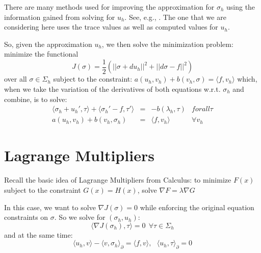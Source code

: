\documentclass{article}
\begin{document}
There are many methods used for improving the approximation for $\sigma_h$ 
using the information gained from solving for $u_h$. 
See, e.g., \cite{ckk02}.
The one that we are 
considering here uses the trace values as well as computed values for $u_h$. 

So, given the approximation $u_h$, we then solve the minimization problem:
minimize the functional 
$$J(\sigma)=\frac{1}{2}\left(||\sigma+du_h||^2+||d\sigma-f||^2\right)$$
over all $\sigma\in\Sigma_h$ 
subject to the constraint: $a(u_h,v_h)+b(v_h,\sigma)=\langle f,v_h\rangle$
which, when we take the variation of the derivatives of 
both equations w.r.t. $\sigma_h$ and combine, is to solve: 
$$\begin{array}{rclr}
	\langle\sigma_h+u_h',\tau\rangle+\langle\sigma_h'-f,\tau'\rangle&=&
	-b(\lambda_h,\tau)&forall\tau\\
	a(u_h,v_h)+b(v_h,\sigma_h)&=&\langle f,v_h\rangle&\forall v_h
\end{array}$$

\section{Lagrange Multipliers}
Recall the basic idea of Lagrange Multipliers from Calculus: 
to minimize $F(x)$ subject to the constraint $G(x) = H(x)$, 
solve $\nabla F=\lambda\nabla G$ 

In this case, we want to solve $\nabla J(\sigma)=0$ while enforcing 
the original equation constraints on $\sigma$. 
So we solve for $(\sigma_h, u_h)$: 
$$\langle\nabla J(\sigma_h), \tau\rangle = 0~~\forall\tau\in\Sigma_h$$
and at the same time:  
$$
\langle u_h,v\rangle-\langle v,\sigma_h\rangle_\partial=\langle f,v\rangle,~~~
\langle u_h,\tau\rangle_\partial = 0
$$


\printbibliography
\end{document}
